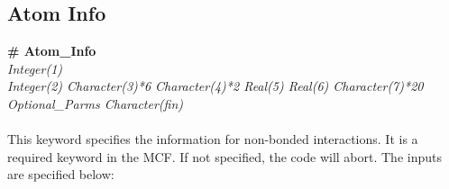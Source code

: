 %
%
%
%
%
%
\subsection{Atom Info}\label{sec:Get_Atom_Info}
%
{\bf \# Atom\_Info} \\
{\it Integer(1)} \\
{\it Integer(2)   Character(3)*6  Character(4)*2   Real(5)   Real(6)
  Character(7)*20     Optional\_Parms  Character(fin)} \\ \\
%
This keyword specifies the information for non-bonded interactions. 
It is a required keyword in the MCF. If not specified, the code will abort. The inputs are specified below: 
%
